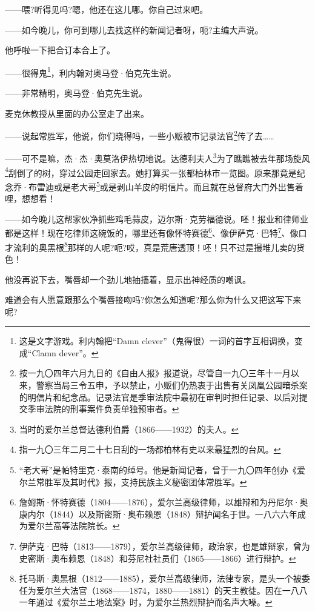 \par ——喂?听得见吗?嗯，他还在这儿哪。你自己过来吧。
\par ——如今晚儿，你可到哪儿去找这样的新闻记者呀，呃?主编大声说。
\par 他呼啦一下把合订本合上了。
\par ——很得鬼\footnote{这是文字游戏。利内翰把“Damn clever”（鬼得很）一词的首字互相调换，变成“Clamn dever”。}，利内翰对奥马登·伯克先生说。
\par ——非常精明，奥马登·伯克先生说。
\par 麦克休教授从里面的办公室走了出来。
\par ——说起常胜军，他说，你们晓得吗，一些小贩被市记录法官\footnote{按一九〇四年六月九日的《自由人报》报道说，尽管自一九〇三年十一月以来，警察当局三令五申，予以禁止，小贩们仍热衷于出售有关凤凰公园暗杀案的明信片和纪念品。记录法官是季审法院中最初在审判时担任记录、以后对提交季审法院的刑事案件负责单独预审者。}传了去……
\par ——可不是嘛，杰·杰·奥莫洛伊热切地说。达德利夫人\footnote{当时的爱尔兰总督达德利伯爵（1866——1932）的夫人。}为了瞧瞧被去年那场旋风\footnote{指一九〇三年二月二十七日刮的一场都柏林有史以来最猛烈的台风。}刮倒了的树，穿过公园走回家去。她打算买一张都柏林市一览图。原来那竟是纪念乔·布雷迪或是老大哥\footnote{“老大哥”是帕特里克·泰南的绰号。他是新闻记者，曾于一九〇四年创办《爱尔兰常胜军及其时代》报，支持民族主义秘密团体常胜军。}或是剥山羊皮的明信片。而且就在总督府大门外出售着哩，想想看！
\par ——如今晚儿这帮家伙净抓些鸡毛蒜皮，迈尔斯·克劳福德说。呸！报业和律师业都是这样！现在吃律师这碗饭的，哪里还有像怀特赛德\footnote{詹姆斯·怀特赛德（1804——1876），爱尔兰高级律师，以雄辩和为丹尼尔·奥康内尔（1844）以及斯密斯·奥布赖恩（1848）辩护闻名于世。一八六六年成为爱尔兰高等法院院长。}、像伊萨克·巴特\footnote{伊萨克·巴特（1813——1879），爱尔兰高级律师，政治家，也是雄辩家，曾为史密斯·奥布赖恩（1848）和芬尼社社员们（1865——1866）进行辩护。}、像口才流利的奥黑根\footnote{托马斯·奥黑根（1812——1885），爱尔兰高级律师，法律专家，是头一个被委任为爱尔兰大法官（1868——1874，1880——1881）的天主教徒。因在一八八一年通过《爱尔兰土地法案》时，为爱尔兰热烈辩护而名声大噪。}那样的人呢?呃?哎，真是荒唐透顶！呸！只不过是撮堆儿卖的货色！
\par 他没再说下去，嘴唇却一个劲儿地抽搐着，显示出神经质的嘲讽。
\par 难道会有人愿意跟那么个嘴唇接吻吗?你怎么知道呢?那么你为什么又把这写下来呢?
